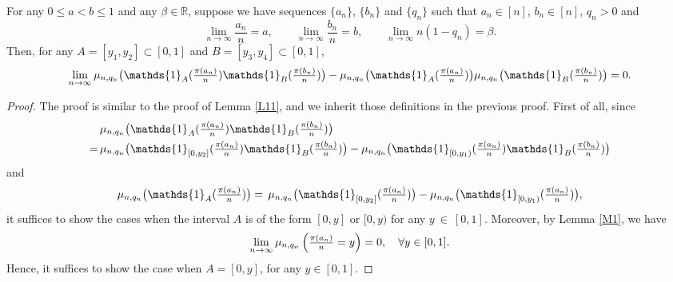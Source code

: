 \begin{lemma}\label{L12}
For any $0 \le a < b \le 1$ and any $\beta \in \mathbb{R}$, suppose we have sequences $\{a_n\}$, $\{b_n\}$ and $\{q_n\}$ such that
$a_n \in [n]$, $b_n \in [n]$, $q_n > 0$ and
\[
\lim_{n \to \infty} \frac{a_n}{n} = a, \qquad \lim_{n \to \infty} \frac{b_n}{n} = b, \qquad \lim_{n \to \infty} n (1 - q_n) = \beta.
\]
Then, for any $A = [y_1, y_2] \subset [0, 1]$ and $B = [y_3, y_4] \subset [0, 1]$,
\[
\textstyle\lim\limits_{n \to \infty}\n\big( \mathds{1}_A(\frac{\pi(a_n)}{n})\mathds{1}_B(\frac{\pi(b_n)}{n})\big) -
 \n \big(\mathds{1}_A(\frac{\pi(a_n)}{n})\big)\n\big(\mathds{1}_B(\frac{\pi(b_n)}{n})\big) = 0.
\]
\end{lemma}

\begin{proof}
The proof is similar to the proof of Lemma \ref{L11}, and we inherit those definitions in the previous proof.
First of all, since
\begin{align*}
  &\textstyle\n\big( \mathds{1}_A(\frac{\pi(a_n)}{n})\mathds{1}_B(\frac{\pi(b_n)}{n})\big)\\
  =\, &\textstyle\n\big( \mathds{1}_{[0, y_2]}(\frac{\pi(a_n)}{n})\mathds{1}_B(\frac{\pi(b_n)}{n})\big) -
       \n\big( \mathds{1}_{[0, y_1)}(\frac{\pi(a_n)}{n})\mathds{1}_B(\frac{\pi(b_n)}{n})\big)
\end{align*}
and
\begin{align*}
   \textstyle\n \big(\mathds{1}_A(\frac{\pi(a_n)}{n})\big) =\, \n \big(\mathds{1}_{[0, y_2]}(\frac{\pi(a_n)}{n})\big) -
       \n \big(\mathds{1}_{[0, y_1)}(\frac{\pi(a_n)}{n})\big),
\end{align*}
it suffices to show the cases when the interval $A$ is of the form $[0, y]$ or $[0, y)$ for any $y~\in~[0, 1]$.
Moreover, by Lemma \ref{M1}, we have
\[
\textstyle\lim\limits_{n \to \infty} \mu_{n, q_n} \left(\frac{\pi(a_n)}{n} = y \right) = 0, \quad \forall y \in [0, 1].
\]
Hence, it suffices to show the case when $A = [0, y]$, for any $y \in [0, 1]$.


\end{proof}
